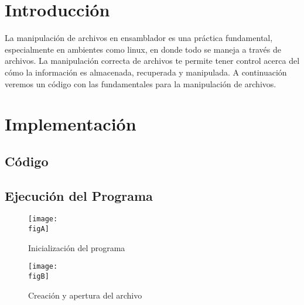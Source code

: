     \restoregeometry %

    \clearpage
    \tableofcontents

    \clearpage
    \listoffigures


    \clearpage
    \lstlistoflistings

    \clearpage
    \vspace*{6pt}
	\centerline{\textbf{\huge \theTitle}}
    \vspace*{8pt}

	\section{Introducción}

	La manipulación de archivos en ensamblador es una práctica fundamental, especialmente
	en ambientes como linux, en donde todo se maneja a través de archivos. La manipulación
	correcta de archivos te permite tener control acerca del cómo la información es
	almacenada, recuperada y manipulada. A continuación veremos un código con las fundamentales
	para la manipulación de archivos.

	\clearpage
	\section{Implementación}

	\subsection{Código}

	

	\subsection{Ejecución del Programa}

	\begin{figure}[h]
		\centering
		\texttt{[image: \\figA]}
		\caption{Inicialización del programa}
	\end{figure}

	\begin{figure}[h]
		\centering
		\texttt{[image: \\figB]}
		\caption{Creación y apertura del archivo}
	\end{figure}

